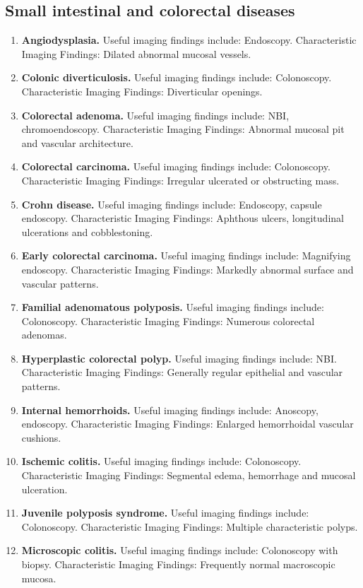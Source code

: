 \subsection{Small intestinal and colorectal diseases}
\begin{enumerate}[leftmargin=*,itemsep=0.45em,topsep=0.4em]
\item \textbf{Angiodysplasia.} Useful imaging findings include: Endoscopy. Characteristic Imaging Findings: Dilated abnormal mucosal vessels.
\item \textbf{Colonic diverticulosis.} Useful imaging findings include: Colonoscopy. Characteristic Imaging Findings: Diverticular openings.
\item \textbf{Colorectal adenoma.} Useful imaging findings include: NBI, chromoendoscopy. Characteristic Imaging Findings: Abnormal mucosal pit and vascular architecture.
\item \textbf{Colorectal carcinoma.} Useful imaging findings include: Colonoscopy. Characteristic Imaging Findings: Irregular ulcerated or obstructing mass.
\item \textbf{Crohn disease.} Useful imaging findings include: Endoscopy, capsule endoscopy. Characteristic Imaging Findings: Aphthous ulcers, longitudinal ulcerations and cobblestoning.
\item \textbf{Early colorectal carcinoma.} Useful imaging findings include: Magnifying endoscopy. Characteristic Imaging Findings: Markedly abnormal surface and vascular patterns.
\item \textbf{Familial adenomatous polyposis.} Useful imaging findings include: Colonoscopy. Characteristic Imaging Findings: Numerous colorectal adenomas.
\item \textbf{Hyperplastic colorectal polyp.} Useful imaging findings include: NBI. Characteristic Imaging Findings: Generally regular epithelial and vascular patterns.
\item \textbf{Internal hemorrhoids.} Useful imaging findings include: Anoscopy, endoscopy. Characteristic Imaging Findings: Enlarged hemorrhoidal vascular cushions.
\item \textbf{Ischemic colitis.} Useful imaging findings include: Colonoscopy. Characteristic Imaging Findings: Segmental edema, hemorrhage and mucosal ulceration.
\item \textbf{Juvenile polyposis syndrome.} Useful imaging findings include: Colonoscopy. Characteristic Imaging Findings: Multiple characteristic polyps.
\item \textbf{Microscopic colitis.} Useful imaging findings include: Colonoscopy with biopsy. Characteristic Imaging Findings: Frequently normal macroscopic mucosa.

\end{enumerate}
